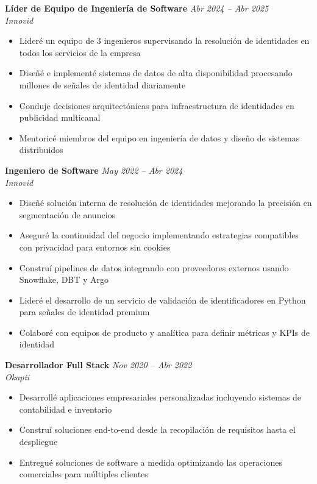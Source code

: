 \documentclass[10pt,a4paper]{article}
\newcommand{\cventry}[3]{%
  \textbf{#1} \hfill \textit{#3}\\[3pt]
  \textit{#2}%
}
\begin{document}
\vspace{0.25cm}

\cventry{Líder de Equipo de Ingeniería de Software}{Innovid}{Abr 2024 -- Abr 2025}
\begin{itemize}[leftmargin=*, noitemsep, topsep=3pt, itemsep=2pt]
  \item Lideré un equipo de 3 ingenieros supervisando la resolución de
        identidades en todos los servicios de la empresa
  \item Diseñé e implementé sistemas de datos de alta disponibilidad
        procesando millones de señales de identidad diariamente
  \item Conduje decisiones arquitectónicas para infraestructura de identidades
        en publicidad multicanal
  \item Mentoricé miembros del equipo en ingeniería de datos y diseño de
        sistemas distribuidos
\end{itemize}

\vspace{0.25cm}

\cventry{Ingeniero de Software}{Innovid}{May 2022 -- Abr 2024}
\begin{itemize}[leftmargin=*, noitemsep, topsep=3pt, itemsep=2pt]
  \item Diseñé solución interna de resolución de identidades mejorando la
        precisión en segmentación de anuncios
  \item Aseguré la continuidad del negocio implementando estrategias compatibles
        con privacidad para entornos sin cookies
  \item Construí pipelines de datos integrando con proveedores externos usando
        Snowflake, DBT y Argo
  \item Lideré el desarrollo de un servicio de validación de identificadores en
        Python para señales de identidad premium
  \item Colaboré con equipos de producto y analítica para definir métricas y
        KPIs de identidad
\end{itemize}

\vspace{0.25cm}

\cventry{Desarrollador Full Stack}{Okapii}{Nov 2020 -- Abr 2022}
\begin{itemize}[leftmargin=*, noitemsep, topsep=3pt, itemsep=2pt]
  \item Desarrollé aplicaciones empresariales personalizadas incluyendo sistemas
        de contabilidad e inventario
  \item Construí soluciones end-to-end desde la recopilación de requisitos hasta
        el despliegue
  \item Entregué soluciones de software a medida optimizando las operaciones
        comerciales para múltiples clientes
\end{itemize}
\end{document}
